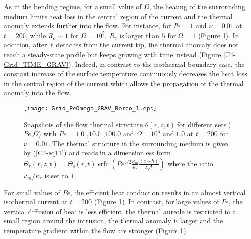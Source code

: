 As in the  bending regime, for a small value  of $\Omega$, the heating
of the  surrounding medium limits heat  loss in the central  region of
the current and the thermal anomaly extends further into the flow. For
instance, for $Pe=1$ and $\nu=0.01$  at $t=200$, while $R_c\sim 1$ for
$\Omega=10^5$,  $R_c$ is  larger than  $5$  for $\Omega  =1 $  (Figure
\ref{C4-Grid_PeOmega_Heating_GRAV}).  In  addition, after  it detaches
from  the  current   tip,  the  thermal  anomaly  does   not  reach  a
steady-state  profile  but keeps  growing  with  time instead  (Figure
\ref{C4-Grid_TIME_GRAV}).   Indeed,  in  contrast  to  the  isothermal
boundary  case,  the  constant  increase of  the  surface  temperature
continuously  decreases the  heat loss  in the  central region  of the
current which allows  the propagation of the thermal  anomaly into the
flow.
\begin{figure}[h!]
  \begin{center}
    \graphicspath{ {/Users/thorey/Documents/These/Projet/Refroidissement/Skin_Model/Figure/Figure_Heating/} }
    \texttt{[image: Grid\_PeOmega\_GRAV\_Berco\_1.eps]}
    \caption{Snapshots of  the flow thermal  structure $\theta(r,z,t)$
      for  different  sets  ($Pe$,$\Omega$)  with  $Pe=  1.0$  ,$10.0$
      ,$100.0$   and   $\Omega=10^5$   and  $1.0$   at   $t=200$   for
      $\nu=0.01$. The  thermal structure in the  surrounding medium is
      given  by  (\ref{C4-eq11}) and  reads  in  a dimensionless  form
      $\Theta_r(r,z,t)=\Theta_s(r,t)\operatorname{erfc}{\left(Pe^{1/2}\frac{\kappa_m}{\kappa_r}\frac{(z-h)}{2\sqrt{t}}\right)}$
      where the ratio $\kappa_m/\kappa_r$ is set to $1$.}
    \label{C4-Grid_PeOmega_Heating_GRAV}
  \end{center}
\end{figure}


For small values of $Pe$, the  efficient heat conduction results in an
almost    vertical    isothermal    current   at    $t=200$    (Figure
\ref{C4-Grid_PeOmega_Heating_GRAV}). In contrast,  for large values of
$Pe$, the  vertical diffusion of  heat is less efficient,  the thermal
aureole  is restricted  to a  small region  around the  intrusion, the
thermal anomaly is larger and the temperature gradient within the flow
are stronger (Figure \ref{C4-Grid_PeOmega_Heating_GRAV}).

